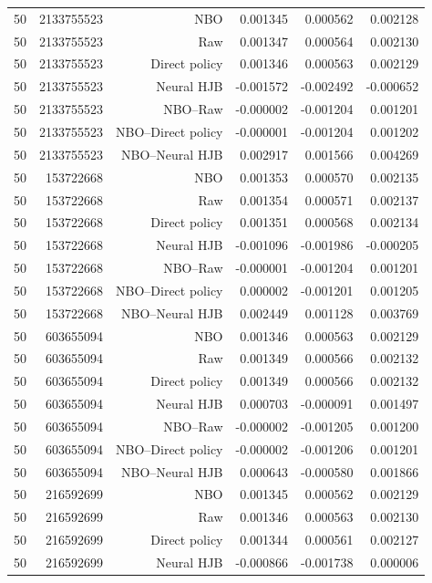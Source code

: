 \begin{longtable}{lrrrrr}
50 & 2133755523 & NBO & 0.001345 & 0.000562 & 0.002128 \\
50 & 2133755523 & Raw & 0.001347 & 0.000564 & 0.002130 \\
50 & 2133755523 & Direct policy & 0.001346 & 0.000563 & 0.002129 \\
50 & 2133755523 & Neural HJB & -0.001572 & -0.002492 & -0.000652 \\
50 & 2133755523 & NBO--Raw & -0.000002 & -0.001204 & 0.001201 \\
50 & 2133755523 & NBO--Direct policy & -0.000001 & -0.001204 & 0.001202 \\
50 & 2133755523 & NBO--Neural HJB & 0.002917 & 0.001566 & 0.004269 \\
50 & 153722668 & NBO & 0.001353 & 0.000570 & 0.002135 \\
50 & 153722668 & Raw & 0.001354 & 0.000571 & 0.002137 \\
50 & 153722668 & Direct policy & 0.001351 & 0.000568 & 0.002134 \\
50 & 153722668 & Neural HJB & -0.001096 & -0.001986 & -0.000205 \\
50 & 153722668 & NBO--Raw & -0.000001 & -0.001204 & 0.001201 \\
50 & 153722668 & NBO--Direct policy & 0.000002 & -0.001201 & 0.001205 \\
50 & 153722668 & NBO--Neural HJB & 0.002449 & 0.001128 & 0.003769 \\
50 & 603655094 & NBO & 0.001346 & 0.000563 & 0.002129 \\
50 & 603655094 & Raw & 0.001349 & 0.000566 & 0.002132 \\
50 & 603655094 & Direct policy & 0.001349 & 0.000566 & 0.002132 \\
50 & 603655094 & Neural HJB & 0.000703 & -0.000091 & 0.001497 \\
50 & 603655094 & NBO--Raw & -0.000002 & -0.001205 & 0.001200 \\
50 & 603655094 & NBO--Direct policy & -0.000002 & -0.001206 & 0.001201 \\
50 & 603655094 & NBO--Neural HJB & 0.000643 & -0.000580 & 0.001866 \\
50 & 216592699 & NBO & 0.001345 & 0.000562 & 0.002129 \\
50 & 216592699 & Raw & 0.001346 & 0.000563 & 0.002130 \\
50 & 216592699 & Direct policy & 0.001344 & 0.000561 & 0.002127 \\
50 & 216592699 & Neural HJB & -0.000866 & -0.001738 & 0.000006 \\

\end{longtable}
